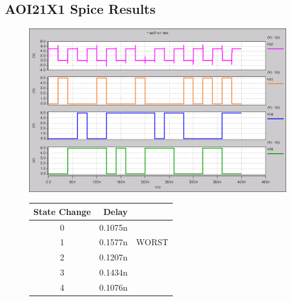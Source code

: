     \newpage
    \subsection{AOI21X1 Spice Results}

        

        \begin{figure}[H]
            \centering
            \begin{minipage}[t]{.50\textwidth}
                \vspace{0pt}
                \centering
                \includegraphics[width=\linewidth]{../../spice/aoi21x1.png}
                \caption{AOI21X1 Spice Results}
            \end{minipage}
            \hfill
            \begin{minipage}[t]{.45\textwidth}
                \vspace{0pt}
                \begin{table}[H]
                    \centering
                    \begin{tabular}{crc}
                        \toprule
                        \textbf{State Change} & \textbf{Delay} & \\
                        \midrule
                        0 & 0.1075n & \\
                        1 & 0.1577n & WORST \\
                        2 & 0.1207n & \\
                        3 & 0.1434n & \\
                        4 & 0.1076n & \\

\end{tabular}
\end{table}
\end{minipage}
\end{figure}
